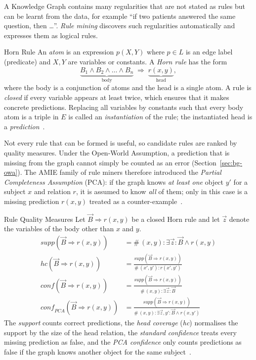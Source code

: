 A Knowledge Graph contains many regularities that are not stated as rules
but can be learnt from the data, for example ``if two patients answered the
same question, then \ldots''. \emph{Rule mining} discovers such regularities
automatically and expresses them as logical rules.

\begin{bgdefinition}{Horn Rule}
An \emph{atom} is an expression $p(X,Y)$ where $p \in L$ is an edge label
(predicate) and $X, Y$ are variables or constants. A \emph{Horn rule} has the
form
\[
  \underbrace{B_1 \wedge B_2 \wedge \dots \wedge B_n}_{\text{body}}
  \;\Rightarrow\;
  \underbrace{r(x,y)}_{\text{head}},
\]
where the body is a conjunction of atoms and the head is a single atom. A rule
is \emph{closed} if every variable appears at least twice, which ensures
that it makes concrete predictions. Replacing all variables by constants such
that every body atom is a triple in $E$ is called an \emph{instantiation} of
the rule; the instantiated head is a \emph{prediction}~\cite{galarraga2013amie,galarraga2015fast}.
\end{bgdefinition}

Not every rule that can be formed is useful, so candidate rules are ranked
by quality measures. Under the Open-World Assumption, a prediction that is
missing from the graph cannot simply be counted as an error
(Section~\ref{sec:bg-owa}). The AMIE family of rule miners therefore
introduced the \emph{Partial Completeness Assumption} (PCA): if the graph
knows \emph{at least one} object $y'$ for a subject $x$ and relation $r$,
it is assumed to know \emph{all} of them; only in this case is a missing
prediction $r(x,y)$ treated as a counter-example~\cite{galarraga2013amie}.

\begin{bgdefinition}{Rule Quality Measures}
Let $\vec{B} \Rightarrow r(x,y)$ be a closed Horn rule and let
$\vec{z}$ denote the variables of the body other than $x$ and $y$.
\begin{align*}
  \mathit{supp}(\vec{B} \Rightarrow r(x,y)) &=
     \#\,(x,y) : \exists \vec{z} : \vec{B} \wedge r(x,y)\\[2pt]
  \mathit{hc}(\vec{B} \Rightarrow r(x,y)) &=
     \frac{\mathit{supp}(\vec{B} \Rightarrow r(x,y))}{\#\,(x',y') : r(x',y')}\\[2pt]
  \mathit{conf}(\vec{B} \Rightarrow r(x,y)) &=
     \frac{\mathit{supp}(\vec{B} \Rightarrow r(x,y))}{\#\,(x,y) : \exists \vec{z} : \vec{B}}\\[2pt]
  \mathit{conf}_{\mathit{PCA}}(\vec{B} \Rightarrow r(x,y)) &=
     \frac{\mathit{supp}(\vec{B} \Rightarrow r(x,y))}{\#\,(x,y) : \exists \vec{z}, y' : \vec{B} \wedge r(x,y')}
\end{align*}
The \emph{support} counts correct predictions, the \emph{head coverage}
(\textit{hc}) normalises the support by the size of the head relation, the
\emph{standard confidence} treats every missing prediction as false, and the
\emph{PCA confidence} only counts predictions as false if the graph knows
another object for the same subject~\cite{galarraga2013amie,galarraga2015fast}.
\end{bgdefinition}

